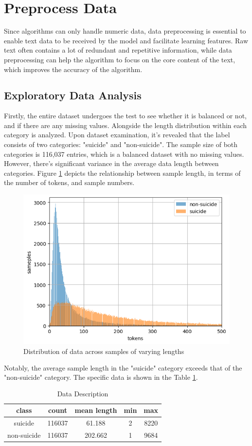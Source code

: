 \documentclass[ %
                    author={Louis Wang},
                supervisor={Dr. Qiang Liu},
                    degree={MSc},
                     title={Identification of Suicide Ideation in Texts},
                      type={},
                      year={2024}]{dissertation}
\begin{document}
\section{Preprocess Data}
\noindent
Since algorithms can only handle numeric data, data preprocessing is essential to enable text data to be received by the model and facilitate learning features. Raw text often contains a lot of redundant and repetitive information, while data preprocessing can help the algorithm to focus on the core content of the text, which improves the accuracy of the algorithm.

\subsection{Exploratory Data Analysis}
\noindent
Firstly, the entire dataset undergoes the test to see whether it is balanced or not, and if there are any missing values. Alongside the length distribution within each category is analyzed. Upon dataset examination, it's revealed that the label consists of two categories: "suicide" and "non-suicide". The sample size of both categories is 116,037 entries, which is a balanced dataset with no missing values. However, there's significant variance in the average data length between categories. Figure \ref{fig:describe} depicts the relationship between sample length, in terms of the number of tokens, and sample numbers. 

\begin{figure}[h]
      \centering
      \includegraphics[width=0.6\linewidth]{../img/data_describe.png}
      \caption{Distribution of data across samples of varying lengths}
      \label{fig:describe}
\end{figure}

Notably, the average sample length in the "suicide" category exceeds that of the "non-suicide" category. The specific data is shown in the Table \ref{tab:describe}.

\begin{table}[h]
      \centering
      \begin{tabular}{ccccc}
            \hline
            class & count & mean length & min & max \\
            \hline
            suicide & 116037 & 61.188 & 2 & 8220 \\
            non-suicide & 116037 & 202.662 & 1 & 9684 \\
            \hline
      \end{tabular}
      \caption{Data Description}
      \label{tab:describe}
\end{table}
\end{document}
